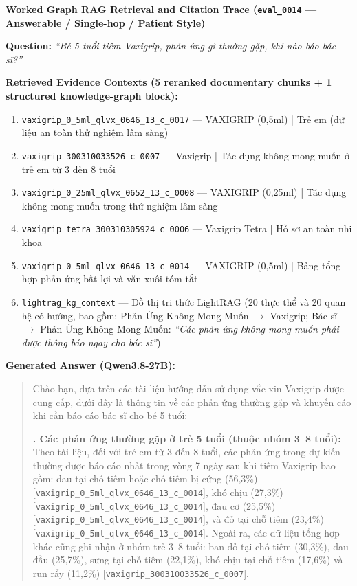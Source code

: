 \documentclass[sn-mathphys, oneside]{sn-jnl}
\newcommand{\vn}[1]{{\fontencoding{T5}\selectfont #1}}
\begin{document}
\begin{tcolorbox}[colback=white,colframe=black!65,boxrule=0.6pt,arc=0pt,left=8pt,right=8pt,top=8pt,bottom=8pt]
\textbf{Worked Graph RAG Retrieval and Citation Trace (\texttt{eval\_0014} --- Answerable / Single-hop / Patient Style)}

\medskip
\textbf{Question:} \emph{\vn{``Bé 5 tuổi tiêm Vaxigrip, phản ứng gì thường gặp, khi nào báo bác sĩ?''}}

\medskip
\textbf{Retrieved Evidence Contexts (5 reranked documentary chunks + 1 structured knowledge-graph block):}
\begin{enumerate}
    \item \texttt{vaxigrip\_0\_5ml\_qlvx\_0646\_13\_c\_0017} --- \vn{VAXIGRIP (0,5ml) | Trẻ em (dữ liệu an toàn thử nghiệm lâm sàng)}
    \item \texttt{vaxigrip\_300310033526\_c\_0007} --- \vn{Vaxigrip | Tác dụng không mong muốn ở trẻ em từ 3 đến 8 tuổi}
    \item \texttt{vaxigrip\_0\_25ml\_qlvx\_0652\_13\_c\_0008} --- \vn{VAXIGRIP (0,25ml) | Tác dụng không mong muốn trong thử nghiệm lâm sàng}
    \item \texttt{vaxigrip\_tetra\_300310305924\_c\_0006} --- \vn{Vaxigrip Tetra | Hồ sơ an toàn nhi khoa}
    \item \texttt{vaxigrip\_0\_5ml\_qlvx\_0646\_13\_c\_0014} --- \vn{VAXIGRIP (0,5ml) | Bảng tổng hợp phản ứng bất lợi và văn xuôi tóm tắt}
    \item \texttt{lightrag\_kg\_context} --- \vn{Đồ thị tri thức LightRAG (20 thực thể và 20 quan hệ có hướng, bao gồm:} \vn{Phản Ứng Không Mong Muốn} $\rightarrow$ \vn{Vaxigrip}; \vn{Bác sĩ} $\rightarrow$ \vn{Phản Ứng Không Mong Muốn}: \emph{\vn{``Các phản ứng không mong muốn phải được thông báo ngay cho bác sĩ''}}\vn{)}
\end{enumerate}

\textbf{Generated Answer (Qwen3.8-27B):}
\begin{quote}
\vn{Chào bạn, dựa trên các tài liệu hướng dẫn sử dụng vắc-xin Vaxigrip được cung cấp, dưới đây là thông tin về các phản ứng thường gặp và khuyến cáo khi cần báo cáo bác sĩ cho bé 5 tuổi:}

\textbf{\vn{1. Các phản ứng thường gặp ở trẻ 5 tuổi (thuộc nhóm 3--8 tuổi):}} \vn{Theo tài liệu, đối với trẻ em từ 3 đến 8 tuổi, các phản ứng trong dự kiến thường được báo cáo nhất trong vòng 7 ngày sau khi tiêm Vaxigrip bao gồm: đau tại chỗ tiêm hoặc chỗ tiêm bị cứng (56,3\%) [\texttt{vaxigrip\_0\_5ml\_qlvx\_0646\_13\_c\_0014}], khó chịu (27,3\%) [\texttt{vaxigrip\_0\_5ml\_qlvx\_0646\_13\_c\_0014}], đau cơ (25,5\%) [\texttt{vaxigrip\_0\_5ml\_qlvx\_0646\_13\_c\_0014}], và đỏ tại chỗ tiêm (23,4\%) [\texttt{vaxigrip\_0\_5ml\_qlvx\_0646\_13\_c\_0014}]. Ngoài ra, các dữ liệu tổng hợp khác cũng ghi nhận ở nhóm trẻ 3--8 tuổi: ban đỏ tại chỗ tiêm (30,3\%), đau đầu (25,7\%), sưng tại chỗ tiêm (22,1\%), khó chịu tại chỗ tiêm (17,6\%) và run rẩy (11,2\%) [\texttt{vaxigrip\_300310033526\_c\_0007}].}


\end{quote}
\end{tcolorbox}
\end{document}
